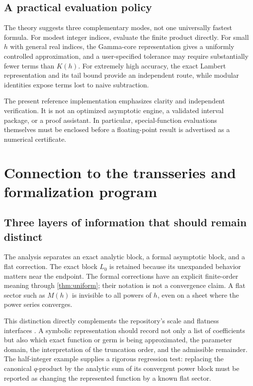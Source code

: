 \documentclass[11pt,a4paper]{article}
\numberwithin{equation}{section}
\theoremstyle{definition}
\begin{document}
\subsection{A practical evaluation policy}
The theory suggests three complementary modes, not one universally fastest formula. For modest integer indices, evaluate the finite product directly. For small $h$ with general real indices, the Gamma-core representation gives a uniformly controlled approximation, and a user-specified tolerance may require substantially fewer terms than $K(h)$. For extremely high accuracy, the exact Lambert representation and its tail bound provide an independent route, while modular identities expose terms lost to naive subtraction.

The present reference implementation emphasizes clarity and independent verification. It is not an optimized asymptotic engine, a validated interval package, or a proof assistant. In particular, special-function evaluations themselves must be enclosed before a floating-point result is advertised as a numerical certificate.

\section{Connection to the transseries and formalization program}
\label{sec:program}

\subsection{Three layers of information that should remain distinct}
The analysis separates an exact analytic block, a formal asymptotic block, and a flat correction. The exact block $L_0$ is retained because its unexpanded behavior matters near the endpoint. The formal corrections have an explicit finite-order meaning through \cref{thm:uniform}; their notation is not a convergence claim. A flat sector such as $M(h)$ is invisible to all powers of $h$, even on a sheet where the power series converges.

This distinction directly complements the repository's scale and flatness interfaces \cite{reporeadme}. A symbolic representation should record not only a list of coefficients but also which exact function or germ is being approximated, the parameter domain, the interpretation of the truncation order, and the admissible remainder. The half-integer example supplies a rigorous regression test: replacing the canonical $q$-product by the analytic sum of its convergent power block must be reported as changing the represented function by a known flat sector.
\end{document}

